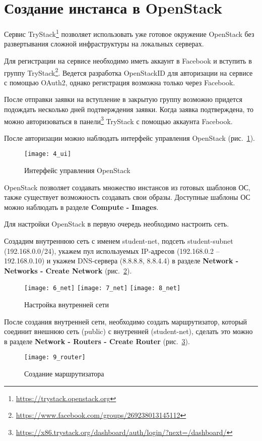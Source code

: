 \section{Создание инстанса в OpenStack} \label{pril:f}

Сервис TryStack\footnote{\url{https://trystack.openstack.org}} позволяет использовать уже готовое окружение OpenStack без развертывания сложной инфраструктуры на локальных серверах.

Для регистрации на сервисе необходимо иметь аккаунт в Facebook и вступить в группу TryStack\footnote{\url{https://www.facebook.com/groups/269238013145112}}.
Ведется разработка OpenStackID для авторизации на сервисе с помощью OAuth2, однако регистрация возможна только через Facebook.

После отправки заявки на вступление в закрытую группу возможно придется подождать несколько дней подтверждения заявки.
Когда заявка подтверждена, то можно авторизоваться в панели\footnote{\url{https://x86.trystack.org/dashboard/auth/login/?next=/dashboard/}} TryStack с помощью аккаунта Facebook.

После авторизации можно наблюдать интерфейс управления OpenStack (рис.~\ref{pic:ui}).
\begin{figure}[ht]
    \centering
    \texttt{[image: 4\_ui]}
    \caption{Интерфейс управления OpenStack}\label{pic:ui}
\end{figure}

OpenStack позволяет создавать множество инстансов из готовых шаблонов ОС, также существует возможность создавать свои образы.
Доступные шаблоны ОС можно наблюдать в разделе \textbf{Compute - Images}.

Для настройки OpenStack в первую очередь необходимо настроить сеть.

Создадим внутреннюю сеть с именем student-net, подсеть student-subnet (192.168.0.0/24), укажем пул используемых IP-адресов (192.168.0.2 -- 192.168.0.10) и укажем DNS-сервера (8.8.8.8, 8.8.4.4) в разделе \textbf{Network - Networks - Create Network} (рис.~\ref{pic:net}).
\begin{figure}[ht]
    \centering
    \texttt{[image: 6\_net]}
    \texttt{[image: 7\_net]}
    \texttt{[image: 8\_net]}
    \caption{Настройка внутренней сети}\label{pic:net}
\end{figure}

\clearpage

После создания внутренней сети, необходимо создать маршрутизатор, который соединит внешнюю сеть (public) с внутренней (student-net), сделать это можно в разделе \textbf{Network - Routers - Create Router} (рис.~\ref{pic:router}).
\begin{figure}[ht]
    \centering
    \texttt{[image: 9\_router]}
    \caption{Создание маршрутизатора}\label{pic:router}
\end{figure}

